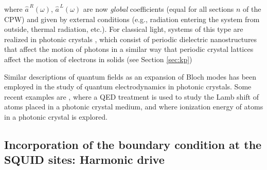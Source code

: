 \newpage
\noindent
where $\hat{a}^{\,R}(\omega)$, $\hat{a}^{\,L}(\omega)$ are now {\em global} coefficients 
(equal for all sections $n$ of the CPW) and
given by external conditions (e.g., radiation entering the system from outside, thermal radiation, etc.). 
For classical light, systems of this type are realized in photonic crystals \cite{Joannopoulos2008}, 
which consist of periodic dielectric nanostructures that affect the motion of photons in a similar way 
that periodic crystal lattices affect the motion of electrons in solids (see Section \ref{sec:kp})

Similar descriptions of quantum fields as an expansion of Bloch modes has been employed in the study of quantum electrodynamics in photonic crystals. Some recent examples are \cite{Gainutdinov2018}, where a QED treatment is used to study the Lamb shift of atoms placed in a photonic crystal medium, and \cite{Gainutdinov2021} where ionization energy of atoms in a photonic crystal is explored.


\subsection{Incorporation of the boundary condition at the SQUID sites: Harmonic drive} 
\label{subsec:bc_drive}

